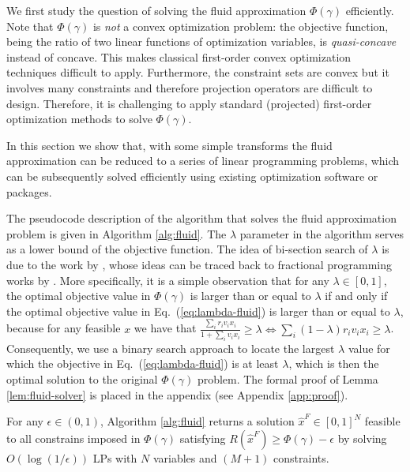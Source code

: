 \documentclass[opre]{informs3aa}
\renewcommand{\hat}{\widehat}
\renewcommand{\hat}{\widehat}
\begin{document}
We first study the question of solving the fluid approximation $\Phi(\gamma)$ efficiently.
Note that $\Phi(\gamma)$ is \emph{not} a convex optimization problem: the objective function,
being the ratio of two linear functions of optimization variables, is \emph{quasi-concave} instead of concave.
This makes classical first-order convex optimization techniques difficult to apply.
Furthermore, the constraint sets are convex but it involves many constraints and therefore projection operators are difficult to design.
Therefore, it is challenging to apply standard (projected) first-order optimization methods to solve $\Phi(\gamma)$.

In this section we show that, with some simple transforms the fluid approximation can be reduced to a series of linear programming problems,
which can be subsequently solved efficiently using existing optimization software or packages.

The pseudocode description of the algorithm that solves the fluid approximation problem is given in Algorithm \ref{alg:fluid}. The $\lambda$ parameter in the algorithm serves as a lower bound of the objective function. The idea of bi-section search of $\lambda$ is due to the work by \cite{rusmevichientong2010dynamic},
whose ideas can be traced back to fractional programming works by \cite{Megiddo1979}.
More specifically, it is a simple observation that for any $\lambda\in[0,1]$, the optimal objective value in $\Phi(\gamma)$ is larger than or equal to $\lambda$
if and only if the optimal objective value in Eq.~(\ref{eq:lambda-fluid}) is larger than or equal to $\lambda$,
because for any feasible $x$ we have that {$\frac{\sum_i r_iv_ix_i}{1+\sum_i v_ix_i}\geq \lambda\Longleftrightarrow \sum_i (1-\lambda)r_iv_ix_i\geq\lambda$}.
Consequently, we use a binary search approach to locate the largest $\lambda$ value for which the objective in Eq.~(\ref{eq:lambda-fluid}) is at least $\lambda$,
which is then the optimal solution to the original $\Phi(\gamma)$ problem. The formal proof of Lemma \ref{lem:fluid-solver} is placed in the appendix (see Appendix \ref{app:proof}).



\begin{lemma}
For any $\epsilon\in(0,1)$, Algorithm \ref{alg:fluid} returns {a solution $\hat x^F\in[0,1]^N$ feasible to all constrains imposed in $\Phi(\gamma)$} satisfying $R(\hat x^F)\geq \Phi(\gamma)-\epsilon$
by solving $O(\log(1/\epsilon))$ LPs with $N$ variables and $(M+1)$ constraints.
\label{lem:fluid-solver}
\end{lemma}
\end{document}
